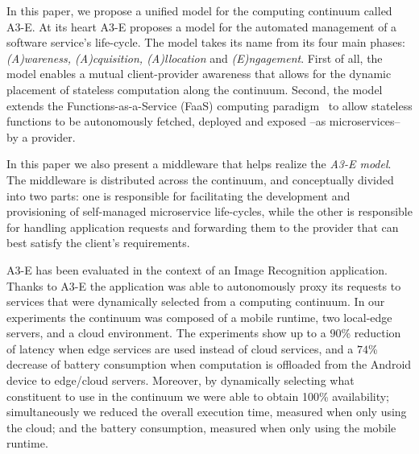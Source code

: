 In this paper, we propose a unified model for the computing continuum called A3-E. At its heart A3-E proposes a model for the automated management of a software service's life-cycle. The model takes its name from its four main phases: \textit{(A)wareness, (A)cquisition, (A)llocation} and \textit{(E)ngagement}. First of all, the model enables a mutual client-provider awareness that allows for the dynamic placement of stateless computation along the continuum. Second, the model extends the Functions-as-a-Service (FaaS) computing paradigm~\cite{Hendrickson:2016,baldini2017serverless,GarrigaMendonca2017} to allow stateless functions to be autonomously fetched, deployed and exposed --as microservices-- by a provider. 

In this paper we also present a middleware that helps realize the \textit{A3-E model}. The middleware is distributed across the continuum, and conceptually divided into two parts: one is responsible for facilitating the development and provisioning of self-managed microservice life-cycles, while the other is responsible for handling application requests and forwarding them to the provider that can best satisfy the client's requirements.



A3-E has been evaluated in the context of an Image Recognition application. Thanks to A3-E the application was able to autonomously proxy its requests to services that were dynamically selected from a computing continuum. In our experiments the continuum was composed of a mobile runtime, two local-edge servers, and a cloud environment. The experiments show up to a $90$\% reduction of latency when edge services are used instead of cloud services, and a $74$\% decrease of battery consumption when computation is offloaded from the Android device to edge/cloud servers. Moreover, by dynamically selecting what constituent to use in the continuum we were able to obtain 100\% availability; simultaneously we reduced the overall execution time, measured when only using the cloud; and the battery consumption, measured when only using the mobile runtime.

